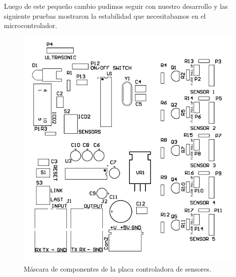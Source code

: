 Luego de este peque\~no cambio pudimos seguir con nuestro desarrollo y las siguiente pruebas
mostraron la estabilidad que necesitabamos en el microcontrolador.

\begin{figure}
	\centering
	\includegraphics[scale=.3]{figuras/sense_componentes.png}
	\caption{M\'ascara de componentes de la placa controladora de sensores.}
	\label{hF_placa_sense_componentes}
\end{figure}

